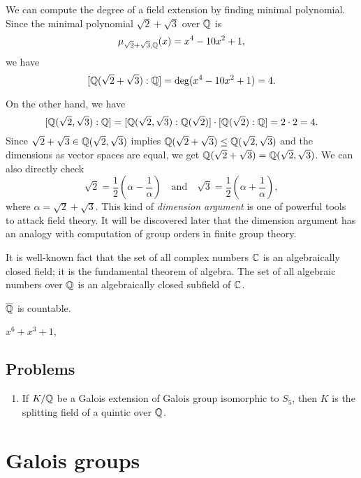 \documentclass{../../large}
\begin{document}
\begin{prb}
We can compute the degree of a field extension by finding minimal polynomial.
Since the minimal polynomial $\sqrt2+\sqrt3$ over $\mathbb{Q}$ is
\[\mu_{\sqrt2+\sqrt3,\mathbb{Q}}(x)=x^4-10x^2+1,\]
we have
\[[\mathbb{Q}(\sqrt2+\sqrt3):\mathbb{Q}]=\deg(x^4-10x^2+1)=4.\]

On the other hand, we have
\[[\mathbb{Q}(\sqrt2,\sqrt3):\mathbb{Q}]=[\mathbb{Q}(\sqrt2,\sqrt3):\mathbb{Q}(\sqrt2)]\cdot[\mathbb{Q}(\sqrt2):\mathbb{Q}]=2\cdot2=4.\]
Since $\sqrt2+\sqrt3\in\mathbb{Q}(\sqrt2,\sqrt3)$ implies $\mathbb{Q}(\sqrt2+\sqrt3)\le\mathbb{Q}(\sqrt2,\sqrt3)$ and the dimensions as vector spaces are equal, we get $\mathbb{Q}(\sqrt2+\sqrt3)=\mathbb{Q}(\sqrt2,\sqrt3)$.
We can also directly check
\[\sqrt2=\frac12\left(\alpha-\frac1\alpha\right)\quad\text{and}\quad\sqrt3=\frac12\left(\alpha+\frac1\alpha\right),\]
where $\alpha=\sqrt2+\sqrt3$.
This kind of \emph{dimension argument} is one of powerful tools to attack field theory.
It will be discovered later that the dimension argument has an analogy with computation of group orders in finite group theory.
\end{prb}


\begin{prb}
It is well-known fact that the set of all complex numbers $\mathbb{C}$ is an algebraically closed field; it is the fundamental theorem of algebra.
The set of all algebraic numbers over $\mathbb{Q}$ is an algebraically closed subfield of $\mathbb{C}$.
\begin{parts}
\item $\overline{\mathbb{Q}}$ is countable.
\end{parts}
\end{prb}


$x^6+x^3+1$,


\section*{Problems}

\begin{enumerate}
\item If $K/\mathbb{Q}$ be a Galois extension of Galois group isomorphic to $S_5$, then $K$ is the splitting field of a quintic over $\mathbb{Q}$.
\end{enumerate}








\chapter{Galois groups}
\end{document}

